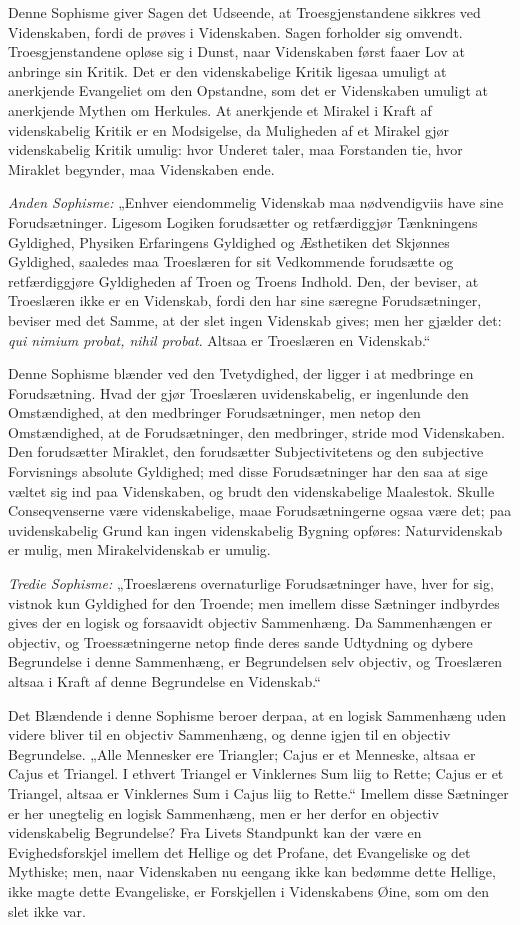 \documentclass[12pt]{book}
\newcommand{\opage}[1]{\marginnote{\footnotesize\textit{[#1]}}}
\begin{document}
Denne Sophisme giver Sagen det Udseende, at Troesgjenstandene sikkres ved Videnskaben,
fordi de prøves i Videnskaben. Sagen forholder sig omvendt. Troesgjenstandene opløse
sig i Dunst, naar Videnskaben først faaer Lov at anbringe sin Kritik. Det er den
videnskabelige Kritik ligesaa umuligt at anerkjende Evangeliet om den Opstandne, som
det er Videnskaben umuligt at anerkjende Mythen om Herkules. At anerkjende et Mirakel i
Kraft af videnskabelig Kritik er en Modsigelse, da Muligheden af et Mirakel gjør
videnskabelig Kritik umulig: hvor Underet taler, maa Forstanden tie, hvor Miraklet
begynder, maa Videnskaben ende.

\emph{Anden Sophisme:} „Enhver eiendommelig Videnskab maa nødvendigviis have sine
Forudsætninger. Ligesom Logiken forudsætter og retfærdiggjør Tænkningens Gyldighed,
Physiken Erfaringens Gyldighed og Æsthetiken det Skjønnes Gyldighed, saaledes maa
Troeslæren for sit Vedkommende forudsætte og retfærdiggjøre Gyldigheden af Troen og
Troens Indhold. Den, der beviser, at Troeslæren ikke er en Videnskab, fordi den har
sine særegne Forudsætninger, beviser med det Samme, at der slet ingen Videnskab gives;
men her gjælder det: \textit{qui nimium probat, nihil probat}. Altsaa er Troeslæren en
Videnskab.“

Denne Sophisme blænder ved den Tvetydighed, der ligger i at medbringe en Forudsætning.
Hvad der gjør Troeslæren uvidenskabelig, er ingenlunde den Omstændighed, at den
medbringer Forudsætninger, men netop den Omstændighed, at de Forudsætninger, den
medbringer, stride mod Videnskaben. Den forudsætter Miraklet, den forudsætter
Subjectivitetens og den subjective Forvisnings absolute Gyldighed; med disse
Forudsætninger har den saa at sige væltet
\opage{80} sig ind paa Videnskaben, og brudt den videnskabelige Maalestok. Skulle Conseqvenserne
være videnskabelige, maae Forudsætningerne ogsaa være det; paa uvidenskabelig Grund kan
ingen videnskabelig Bygning opføres: Naturvidenskab er mulig, men Mirakelvidenskab er
umulig.

\emph{Tredie Sophisme:} „Troeslærens overnaturlige Forudsætninger have, hver for sig,
vistnok kun Gyldighed for den Troende; men imellem disse Sætninger indbyrdes gives der
en logisk og forsaavidt objectiv Sammenhæng. Da Sammenhængen er objectiv, og
Troessætningerne netop finde deres sande Udtydning og dybere Begrundelse i denne
Sammenhæng, er Begrundelsen selv objectiv, og Troeslæren altsaa i Kraft af denne
Begrundelse en Videnskab.“

Det Blændende i denne Sophisme beroer derpaa, at en logisk Sammenhæng uden videre
bliver til en objectiv Sammenhæng, og denne igjen til en objectiv Begrundelse. „Alle
Mennesker ere Triangler; Cajus er et Menneske, altsaa er Cajus et Triangel. I ethvert
Triangel er Vinklernes Sum liig to Rette; Cajus er et Triangel, altsaa er Vinklernes
Sum i Cajus liig to Rette.“ Imellem disse Sætninger er her unegtelig en logisk
Sammenhæng, men er her derfor en objectiv videnskabelig Begrundelse? Fra Livets
Standpunkt kan der være en Evighedsforskjel imellem det Hellige og det Profane, det
Evangeliske og det Mythiske; men, naar Videnskaben nu eengang ikke kan bedømme dette
Hellige, ikke magte dette Evangeliske, er Forskjellen i Videnskabens Øine, som om den
slet ikke var.
\end{document}
